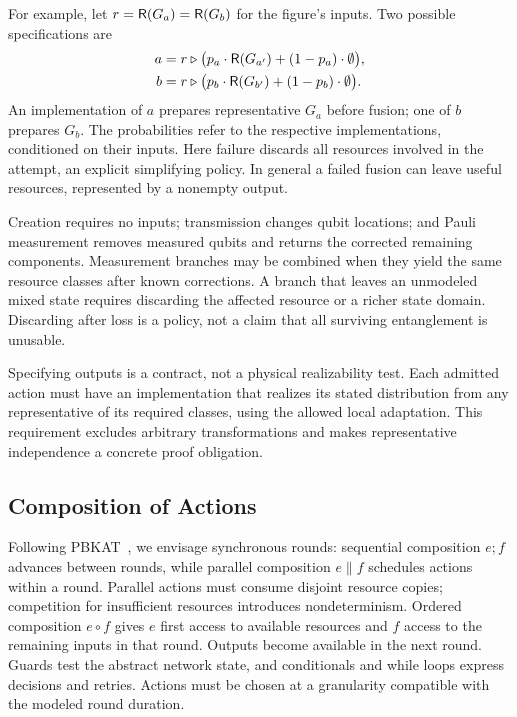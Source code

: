 For example, let $r=\mathsf{R}(G_a)=\mathsf{R}(G_b)$ for the figure's inputs. Two possible specifications are
\[
\begin{aligned}
a&=r \triangleright \bigl(p_a\cdot\mathsf{R}(G_{a'})+(1-p_a)\cdot\emptyset\bigr),\\
b&=r \triangleright \bigl(p_b\cdot\mathsf{R}(G_{b'})+(1-p_b)\cdot\emptyset\bigr).
\end{aligned}
\]
An implementation of $a$ prepares representative $G_a$ before fusion; one of $b$ prepares $G_b$. The probabilities refer to the respective implementations, conditioned on their inputs. Here failure discards all resources involved in the attempt, an explicit simplifying policy. In general a failed fusion can leave useful resources, represented by a nonempty output.

Creation requires no inputs; transmission changes qubit locations; and Pauli measurement removes measured qubits and returns the corrected remaining components. Measurement branches may be combined when they yield the same resource classes after known corrections. A branch that leaves an unmodeled mixed state requires discarding the affected resource or a richer state domain. Discarding after loss is a policy, not a claim that all surviving entanglement is unusable.

Specifying outputs is a contract, not a physical realizability test. Each admitted action must have an implementation that realizes its stated distribution from any representative of its required classes, using the allowed local adaptation. This requirement excludes arbitrary transformations and makes representative independence a concrete proof obligation.

\subsection{Composition of Actions}
\label{sec:composition}

Following PBKAT~\cite{buckley2025pbkat}, we envisage synchronous rounds: sequential composition $e;f$ advances between rounds, while parallel composition $e\parallel f$ schedules actions within a round. Parallel actions must consume disjoint resource copies; competition for insufficient resources introduces nondeterminism. Ordered composition $e\circ f$ gives $e$ first access to available resources and $f$ access to the remaining inputs in that round. Outputs become available in the next round. Guards test the abstract network state, and conditionals and while loops express decisions and retries. Actions must be chosen at a granularity compatible with the modeled round duration.

